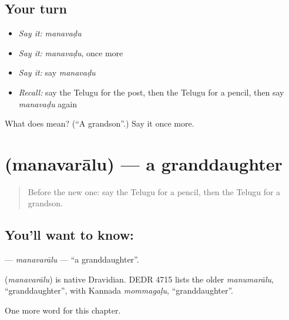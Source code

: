 \subsection*{Your turn}
\begin{itemize}
\raggedright
  \item \emph{Say it:} \emph{manavaḍu}
  \item \emph{Say it:} \emph{manavaḍu}, once more
  \item \emph{Say it:} say \emph{manavaḍu}
  \item \emph{Recall:} say the Telugu for the post, then the Telugu for a pencil, then say \emph{manavaḍu} again
\end{itemize}

\begin{tcolorbox}[breakable,colback=teal!4,colframe=teal!35!black,title={Before you move on}]
What does  mean? (\textquotedblleft{}A grandson\textquotedblright{}.) Say it once more.
\end{tcolorbox}
\section[\texorpdfstring{\te{మనవరాలు} (manavarālu)}{మనవరాలు (manavarālu)}]{ (manavarālu) — a granddaughter}

\label{lesson:TE-C186-manavaralu}



\begin{quote}
Before the new one: say the Telugu for a pencil, then the Telugu for a grandson.
\end{quote}

\subsection*{You'll want to know: }
\textbf{} — \emph{manavarālu} — \textquotedblleft{}a granddaughter\textquotedblright{}.

\begin{cousinweb}
\textbf{} (\emph{manavarālu}) is native Dravidian. DEDR 4715 lists the older \emph{manumarālu}, \textquotedblleft{}granddaughter\textquotedblright{}, with Kannada \emph{mommagaḷu}, \textquotedblleft{}granddaughter\textquotedblright{}.
\end{cousinweb}

\begin{grammarlens}[title={What you've built}]
One more word for this chapter.
\end{grammarlens}

